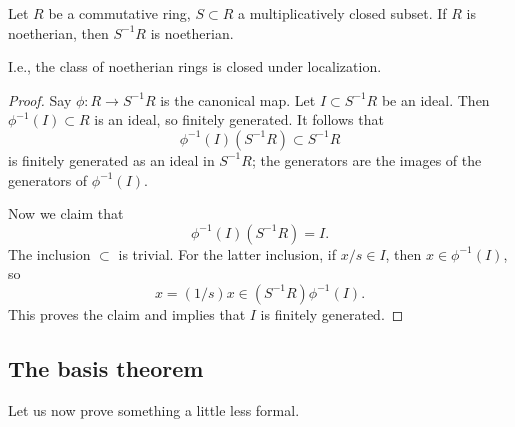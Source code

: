 \begin{proposition} 
Let $R$ be a commutative ring, $S \subset R$ a multiplicatively closed subset.   If
$R$ is noetherian, then $S^{-1}R$ is noetherian.
\end{proposition} 
I.e., the class of noetherian rings is closed under localization.
\begin{proof} 
Say $\phi: R \to S^{-1}R$ is the canonical map. Let $I \subset S^{-1}R$ be an
ideal. Then $\phi^{-1}(I) \subset R$ is an ideal, so finitely generated. It
follows that
\[ \phi^{-1}(I)( S^{-1}R )\subset S^{-1}R  \]
is finitely generated as an ideal in $S^{-1}R$; the generators are the images
of the generators of $\phi^{-1}(I)$.

Now we claim that
\[  \phi^{-1}(I)( S^{-1}R ) = I . \]
The inclusion $\subset$ is trivial. For the latter inclusion, if $x/s \in I$,
then $x \in \phi^{-1}(I)$, so 
\[ x = (1/s) x \in (S^{-1}R) \phi^{-1}(I).  \] This proves the claim and
implies that $I$ is finitely generated.
\end{proof} 

\subsection{The basis theorem}
Let us now prove something a little less formal.

